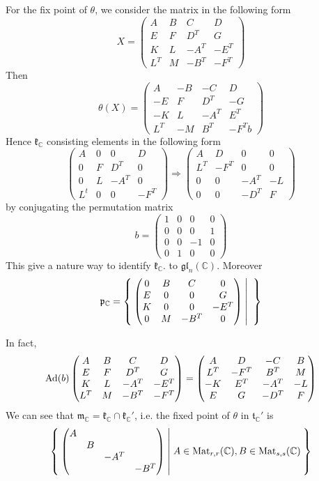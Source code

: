 \documentclass[12pt]{article}
\def\Mat{{\rm Mat}}
\def\bC{{\mathbb{C}}}
\def\Ad{{\rm Ad}}
\def\Ad{\mathrm{Ad}}
\def\agl{\mathfrak{gl}}
\def\fpp{\mathfrak{p}}
\def\ftt{\mathfrak{t}}
\def\fkk{\mathfrak{k}}
\def\fmm{\mathfrak{m}}
\def\Mat{\mathrm{Mat}}
\begin{document}
For the fix point of $\theta$, we consider the matrix in the following form
\[
X = \begin{pmatrix}
  A & B & C & D\\
  E & F & {D}^{T} & G\\
  K & L & -{A}^{T} & -{E}^{T}\\
  {L}^{T} & M & -{B}^{T} & -{F}^{T}
\end{pmatrix}
\]
Then 
\[
\theta(X) = 
\begin{pmatrix}
  A & -B & -C & D\\
  -E & F & {D}^{T} & -G\\
  -K & L & -{A}^{T} & {E}^{T}\\
  {L}^{T} & -M & {B}^{T} & -{F}^{T}
b\end{pmatrix}
\]
Hence $\fkk_\bC$ consisting elements in the following form
\[
\begin{pmatrix}
  A & 0 & 0 & D\\
  0 & F & {D}^{T} & 0\\
  0 & L & -{A}^{T} & 0\\
 {L}^{t} & 0 & 0 & -{F}^{T}
\end{pmatrix}
\Rightarrow
\begin{pmatrix}
  A & D & 0 & 0\\
  {L}^{T} & -{F}^{T} & 0 & 0\\
  0 & 0 & -{A}^{T} & -L\\
  0 & 0 & -{D}^{T} & F
\end{pmatrix}
\]
by conjugating the permutation matrix
\[
b=\begin{pmatrix}
  1 & 0 & 0 & 0\\
  0 & 0 & 0 & 1\\
  0 & 0 & -1 & 0\\
  0 & 1 & 0 & 0
\end{pmatrix}
\]
This give a nature way to identify $\fkk_\bC$. to $\agl_n(\bC)$.
Moreover 
\[
\fpp_\bC = \Set{
\begin{pmatrix}
  0 & B & C & 0\\
 E & 0 & 0 & G\\
 K & 0 & 0 & -{E}^{T}\\
 0 & M & -{B}^{T} & 0
\end{pmatrix}
|
}
\]

In fact, 
\[
\Ad(b) 
\begin{pmatrix}
A & B & C & D\cr
E & F & {D}^{T} & G\cr
K & L & -{A}^{T} & -{E}^{T}\cr 
{L}^{T} & M & -{B}^{T} & -{F}^{T}
\end{pmatrix}
=
\begin{pmatrix}
A & D & -C & B\cr 
{L}^{T} & -{F}^{T} & {B}^{T} & M\cr
 -K & {E}^{T} & -{A}^{T} & -L\cr
 E & G & -{D}^{T} & F
\end{pmatrix}
\]
We can see that $\fmm_\bC = \fkk_\bC \cap \fkk_\bC'$, i.e. 
the fixed point of $\theta$ in $\ftt_\bC'$ is 
\[
\Set{\begin{pmatrix}
    A & & & \\
    & B & & \\
    & & -A^T &\\
    & & & -B^T 
  \end{pmatrix}|
  A\in \Mat_{r,r}(\bC), B\in \Mat_{s,s}(\bC)
}
\]
\end{document}
